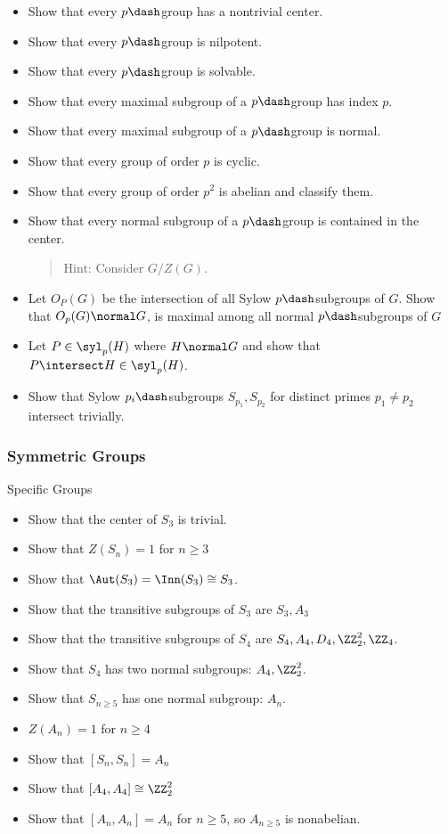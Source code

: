 \begin{itemize}
\item
  Show that every \(p\dash\)group has a nontrivial center.
\item
  Show that every \(p\dash\)group is nilpotent.
\item
  Show that every \(p\dash\)group is solvable.
\item
  Show that every maximal subgroup of a \(p\dash\)group has index \(p\).
\item
  Show that every maximal subgroup of a \(p\dash\)group is normal.
\item
  Show that every group of order \(p\) is cyclic.
\item
  Show that every group of order \(p^2\) is abelian and classify them.
\item
  Show that every normal subgroup of a \(p\dash\)group is contained in
  the center.

  \begin{quote}
  Hint: Consider \(G/Z(G)\).
  \end{quote}
\item
  Let \(O_P(G)\) be the intersection of all Sylow \(p\dash\)subgroups of
  \(G\). Show that \(O_p(G) \normal G\), is maximal among all normal
  \(p\dash\)subgroups of \(G\)
\item
  Let \(P\in \syl_p(H)\) where \(H\normal G\) and show that
  \(P\intersect H \in \syl_p(H)\).
\item
  Show that Sylow \(p_i\dash\)subgroups \(S_{p_1}, S_{p_2}\) for
  distinct primes \(p_1\neq p_2\) intersect trivially.
\end{itemize}

\hypertarget{symmetric-groups}{%
\subsubsection{Symmetric Groups}\label{symmetric-groups}}

Specific Groups

\begin{itemize}
\tightlist
\item
  Show that the center of \(S_3\) is trivial.
\item
  Show that \(Z(S_n) = 1\) for \(n\geq 3\)
\item
  Show that \(\Aut(S_3) = \Inn(S_3) \cong S_3\).
\item
  Show that the transitive subgroups of \(S_3\) are \(S_3, A_3\)
\item
  Show that the transitive subgroups of \(S_4\) are
  \(S_4, A_4, D_4, \ZZ_2^2, \ZZ_4\).
\item
  Show that \(S_4\) has two normal subgroups: \(A_4, \ZZ_2^2\).
\item
  Show that \(S_{n\geq 5}\) has one normal subgroup: \(A_n\).
\item
  \(Z(A_n) = 1\) for \(n\geq 4\)
\item
  Show that \([S_n, S_n] = A_n\)
\item
  Show that \([A_4, A_4] \cong \ZZ_2^2\)
\item
  Show that \([A_n, A_n] = A_n\) for \(n\geq 5\), so \(A_{n\geq 5}\) is
  nonabelian.
\end{itemize}

